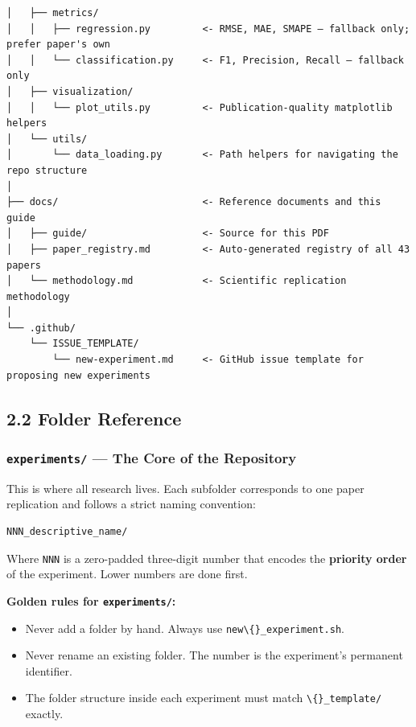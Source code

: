 \begin{verbatim}
│   ├── metrics/
│   │   ├── regression.py         <- RMSE, MAE, SMAPE — fallback only; prefer paper's own
│   │   └── classification.py     <- F1, Precision, Recall — fallback only
│   ├── visualization/
│   │   └── plot_utils.py         <- Publication-quality matplotlib helpers
│   └── utils/
│       └── data_loading.py       <- Path helpers for navigating the repo structure
│
├── docs/                         <- Reference documents and this guide
│   ├── guide/                    <- Source for this PDF
│   ├── paper_registry.md         <- Auto-generated registry of all 43 papers
│   └── methodology.md            <- Scientific replication methodology
│
└── .github/
    └── ISSUE_TEMPLATE/
        └── new-experiment.md     <- GitHub issue template for proposing new experiments
\end{verbatim}

\subsection{2.2 Folder Reference}\label{folder-reference}

\subsubsection{\texorpdfstring{\texttt{experiments/} --- The Core of the
Repository}{experiments/ --- The Core of the Repository}}\label{experiments-the-core-of-the-repository}

This is where all research lives. Each subfolder corresponds to one
paper replication and follows a strict naming convention:

\begin{verbatim}
NNN_descriptive_name/
\end{verbatim}

Where \texttt{NNN} is a zero-padded three-digit number
that encodes the \textbf{priority order} of the experiment. Lower
numbers are done first.

\textbf{Golden rules for \texttt{experiments/}:}

\begin{itemize}
\tightlist
\item
  Never add a folder by hand. Always use
  \texttt{new\textbackslash\{\}\_experiment.sh}.
\item
  Never rename an existing folder. The number is the experiment's
  permanent identifier.
\item
  The folder structure inside each experiment must match
  \texttt{\textbackslash\{\}\_template/} exactly.
\end{itemize}

